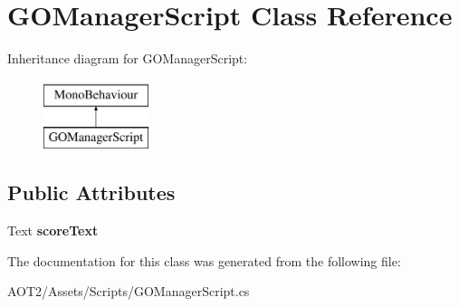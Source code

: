 \hypertarget{class_g_o_manager_script}{}\section{G\+O\+Manager\+Script Class Reference}
\label{class_g_o_manager_script}
Inheritance diagram for G\+O\+Manager\+Script\+:\begin{figure}[H]
\begin{center}
\leavevmode
\includegraphics[height=2.000000cm]{class_g_o_manager_script}
\end{center}
\end{figure}
\subsection*{Public Attributes}
\begin{DoxyCompactItemize}
\item 
\hypertarget{class_g_o_manager_script_ae6df0f7858c9b610f96af2e6bc84dcad}{}Text {\bfseries score\+Text}\label{class_g_o_manager_script_ae6df0f7858c9b610f96af2e6bc84dcad}

\end{DoxyCompactItemize}


The documentation for this class was generated from the following file\+:\begin{DoxyCompactItemize}
\item 
A\+O\+T2/\+Assets/\+Scripts/G\+O\+Manager\+Script.\+cs\end{DoxyCompactItemize}
